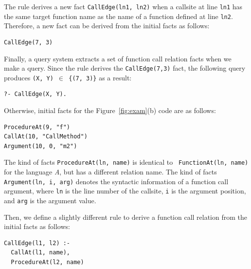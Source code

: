 \noindent
The rule derives a new fact {\tt CallEdge(ln1, ln2)} when a callsite at line
{\tt ln1} has the same target function name as the name of a function defined
at line {\tt ln2}. Therefore, a new fact can be derived from the initial facts
as follows: 

\begin{lstlisting}
CallEdge(7, 3)
\end{lstlisting}

Finally, a query system extracts a set of function call relation facts when we
make a query. Since the rule derives the {\tt CallEdge(7,3)} fact, the
following query produces {\tt (X, Y) $\in$ \{(7, 3)\}} as a result:


\begin{lstlisting}
?- CallEdge(X, Y).
\end{lstlisting}


Otherwise, initial facts for the Figure~\ref{fig:exam}(b) code are as follows: 

\begin{lstlisting}
ProcedureAt(9, "f")
CallAt(10, "CallMethod")
Argument(10, 0, "m2")
\end{lstlisting}

\noindent
The kind of facts {\tt ProcedureAt(ln, name)} is identical to {\tt
FunctionAt(ln, name)} for the language {\it A}, but has a different relation
name. The kind of facts {\tt Argument(ln, i, arg)} denotes the syntactic
information of a function call argument, where {\tt ln} is the line number of
the callsite, {\tt i} is the argument position, and {\tt arg} is the argument
value.

Then, we define a slightly different rule to derive a function call relation
from the initial facts as follows: 

\begin{lstlisting}
CallEdge(l1, l2) :-
  CallAt(l1, name),
  ProcedureAt(l2, name)
\end{lstlisting}

